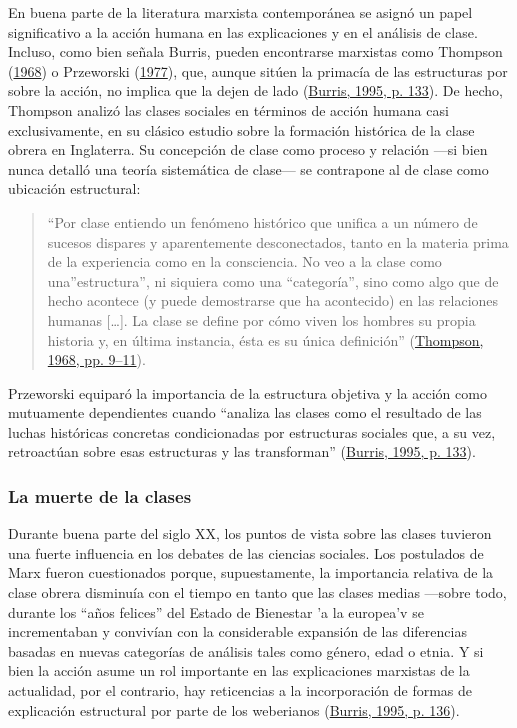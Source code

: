 \documentclass[
]{article}
\begin{document}
En buena parte de la literatura marxista contemporánea se asignó un papel significativo a la acción humana en las explicaciones y en el análisis de clase. Incluso, como bien señala Burris, pueden encontrarse marxistas como Thompson (\protect\hyperlink{ref-Thompson1968}{1968}) o Przeworski (\protect\hyperlink{ref-Przeworski1977}{1977}), que, aunque sitúen la primacía de las estructuras por sobre la acción, no implica que la dejen de lado (\protect\hyperlink{ref-Burris1995}{Burris, 1995, p. 133}). De hecho, Thompson analizó las clases sociales en términos de acción humana casi exclusivamente, en su clásico estudio sobre la formación histórica de la clase obrera en Inglaterra. Su concepción de clase como proceso y relación ---si bien nunca detalló una teoría sistemática de clase--- se contrapone al de clase como ubicación estructural:

\begin{quote}
``Por clase entiendo un fenómeno histórico que unifica a un número de sucesos dispares y aparentemente desconectados, tanto en la materia prima de la experiencia como en la consciencia. No veo a la clase como una''estructura'', ni siquiera como una ``categoría'', sino como algo que de hecho acontece (y puede demostrarse que ha acontecido) en las relaciones humanas {[}\ldots{]}. La clase se define por cómo viven los hombres su propia historia y, en última instancia, ésta es su única definición'' (\protect\hyperlink{ref-Thompson1968}{Thompson, 1968, pp. 9--11}).
\end{quote}

Przeworski equiparó la importancia de la estructura objetiva y la acción como mutuamente dependientes cuando ``analiza las clases como el resultado de las luchas históricas concretas condicionadas por estructuras sociales que, a su vez, retroactúan sobre esas estructuras y las transforman'' (\protect\hyperlink{ref-Burris1995}{Burris, 1995, p. 133}).

\hypertarget{la-muerte-de-la-clases}{%
\subsubsection{La muerte de la clases}\label{la-muerte-de-la-clases}}

Durante buena parte del siglo XX, los puntos de vista sobre las clases tuvieron una fuerte influencia en los debates de las ciencias sociales. Los postulados de Marx fueron cuestionados porque, supuestamente, la importancia relativa de la clase obrera disminuía con el tiempo en tanto que las clases medias ---sobre todo, durante los ``años felices'' del Estado de Bienestar 'a la europea'v se incrementaban y convivían con la considerable expansión de las diferencias basadas en nuevas categorías de análisis tales como género, edad o etnia. Y si bien la acción asume un rol importante en las explicaciones marxistas de la actualidad, por el contrario, hay reticencias a la incorporación de formas de explicación estructural por parte de los weberianos (\protect\hyperlink{ref-Burris1995}{Burris, 1995, p. 136}).
\end{document}
